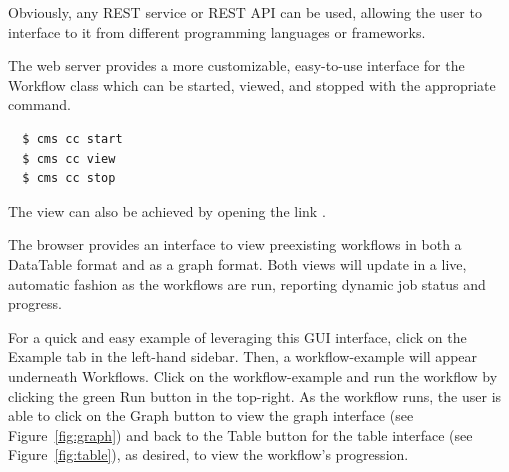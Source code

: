 \documentclass[sigplan,screen]{acmart}
\begin{document}
Obviously, any REST service or REST API can be used, allowing the user
to interface to it from different programming languages or frameworks.

The web server provides a more customizable, easy-to-use interface for
the Workflow class which can be started, viewed, and stopped with the
appropriate command.

\begin{verbatim}
  $ cms cc start
  $ cms cc view
  $ cms cc stop
\end{verbatim}

The view can also be achieved by opening the 
link .

The browser provides an interface to view preexisting workflows in
both a DataTable format and as a graph format. Both views will update
in a live, automatic fashion as the workflows are run, reporting
dynamic job status and progress.

For a quick and easy example of leveraging this GUI interface, click
on the Example tab in the left-hand sidebar. Then, a workflow-example
will appear underneath Workflows. Click on the workflow-example and
run the workflow by clicking the green Run button in the top-right. As
the workflow runs, the user is able to click on the Graph button to
view the graph interface (see Figure~\ref{fig:graph}) and back to the
Table button for the table interface (see Figure~\ref{fig:table}), as
desired, to view the workflow's progression.
\end{document}
